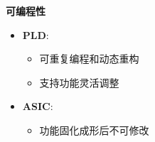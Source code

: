 \documentclass{beamer}
\providecommand{\tightlist}{%
  \setlength{\itemsep}{0pt}\setlength{\parskip}{0pt}}
\begin{document}
\begin{frame}{\textbf{可编程性}}

\begin{itemize}
\tightlist
\item
    \textbf{PLD}:

    \begin{itemize}
    \tightlist
    \item
    可重复编程和动态重构\\
    \item
    支持功能灵活调整\\
    \end{itemize}
\item
    \textbf{ASIC}:

    \begin{itemize}
    \tightlist
    \item
    功能固化成形后不可修改
    \end{itemize}
\end{itemize}
\end{frame}
\end{document}
